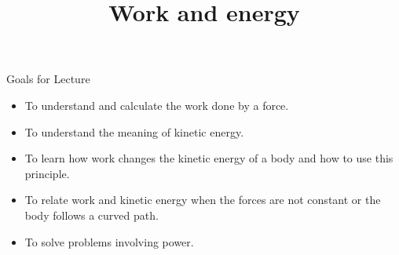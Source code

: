 \documentclass[18pt]{LectMechanics}
\title[Physics 1]{\huge\bfseries Work and energy}
\date{}
\begin{document}
%
\begin{frame}
	\titlepage
\end{frame}
\usebackgroundtemplate{
}




\begin{frame}{Goals for Lecture}{}
	\begin{itemize}
		\item To understand and calculate the work done by a force.
		\item To understand the meaning of kinetic energy.
		\item To learn how work changes the kinetic energy of a body and how to use this principle.
		\item To relate work and kinetic energy when the forces are not constant or the body follows a curved path.
		\item To solve problems involving power.
	\end{itemize}
\end{frame}
\end{document}
